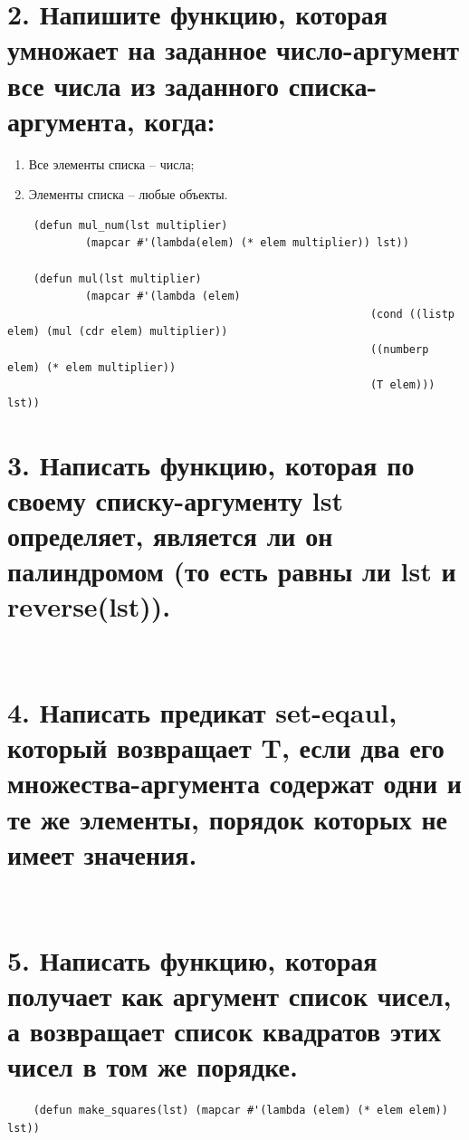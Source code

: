 \documentclass[12pt]{report}
\begin{document}
\section*{2. Напишите функцию, которая умножает на заданное число-аргумент все числа из заданного списка-аргумента, когда:}

\begin{enumerate}
	\item Все элементы списка -- числа;
	\item Элементы списка -- любые объекты.
\end{enumerate}

\begin{lstlisting}
	(defun mul_num(lst multiplier)
			(mapcar #'(lambda(elem) (* elem multiplier)) lst))
	
	(defun mul(lst multiplier)
			(mapcar #'(lambda (elem)
														(cond ((listp elem) (mul (cdr elem) multiplier))
														((numberp elem) (* elem multiplier))
														(T elem))) lst))
\end{lstlisting}

\section*{3. Написать функцию, которая по своему списку-аргументу lst определяет, является ли он палиндромом (то есть равны ли lst и reverse(lst)).}

\begin{lstlisting}
	
\end{lstlisting}

\section*{4. Написать предикат set-eqaul, который возвращает T, если два его множества-аргумента содержат одни и те же элементы, порядок которых не имеет значения.}

\begin{lstlisting}
	
\end{lstlisting}

\section*{5. Написать функцию, которая получает как аргумент список чисел, а возвращает список квадратов этих чисел в том же порядке.}

\begin{lstlisting}
	(defun make_squares(lst) (mapcar #'(lambda (elem) (* elem elem)) lst))
\end{lstlisting}
\end{document}
